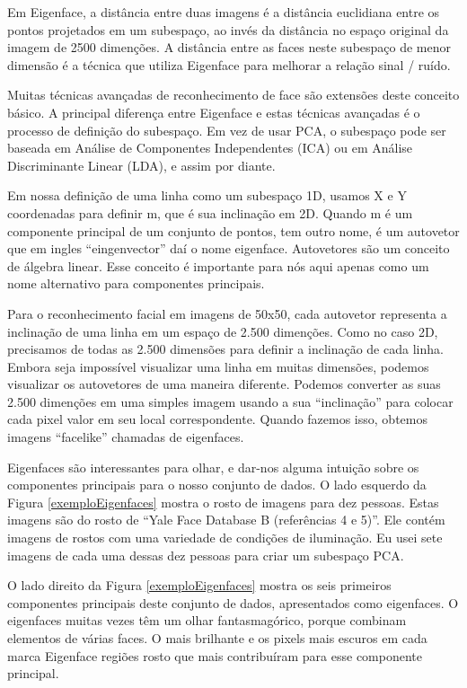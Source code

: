 Em Eigenface, a distância entre duas imagens é a distância euclidiana entre os pontos projetados em um subespaço, ao invés da distância no espaço original da imagem de 2500 dimenções. A distância entre as faces neste subespaço de menor dimensão é a técnica que utiliza Eigenface para melhorar a relação sinal / ruído.

Muitas técnicas avançadas de reconhecimento de face são extensões deste conceito básico. A principal diferença entre Eigenface e estas técnicas avançadas é o processo de definição do subespaço. Em vez de usar PCA, o subespaço pode ser baseada em Análise de Componentes Independentes (ICA) ou em Análise Discriminante Linear (LDA), e assim por diante.

Em nossa definição de uma linha como um subespaço 1D, usamos X e Y coordenadas para definir m, que é sua inclinação em 2D. Quando m é um componente principal de um conjunto de pontos, tem outro nome, é um autovetor que em ingles ``eingenvector'' daí o nome eigenface. Autovetores são um conceito de álgebra linear. Esse conceito é importante para nós aqui apenas como um nome alternativo para componentes principais. 

Para o reconhecimento facial em imagens de 50x50, cada autovetor representa a inclinação de uma linha em um espaço de 2.500 dimenções. Como no caso 2D, precisamos de todas as 2.500 dimensões para definir a inclinação de cada linha. Embora seja impossível visualizar uma linha em muitas dimensões, podemos visualizar os autovetores de uma maneira diferente. Podemos converter as suas 2.500 dimenções em uma simples imagem usando a sua ``inclinação'' para colocar cada pixel valor em seu local correspondente. Quando fazemos isso, obtemos imagens ``facelike'' chamadas de eigenfaces.

Eigenfaces são interessantes para olhar, e dar-nos alguma intuição sobre os componentes principais para o nosso conjunto de dados. O lado esquerdo da Figura \ref{exemploEigenfaces} mostra o rosto de imagens para dez pessoas. Estas imagens são do rosto de ``Yale Face Database B (referências 4 e 5)''. Ele contém imagens de rostos com uma variedade de condições de iluminação. Eu usei sete imagens de cada uma dessas dez pessoas para criar um subespaço PCA. 

O lado direito da Figura \ref{exemploEigenfaces} mostra os seis primeiros componentes principais deste conjunto de dados, apresentados como eigenfaces. O eigenfaces muitas vezes têm um olhar fantasmagórico, porque combinam elementos de várias faces. O mais brilhante e os pixels mais escuros em cada marca Eigenface regiões rosto que mais contribuíram para esse componente principal. 

